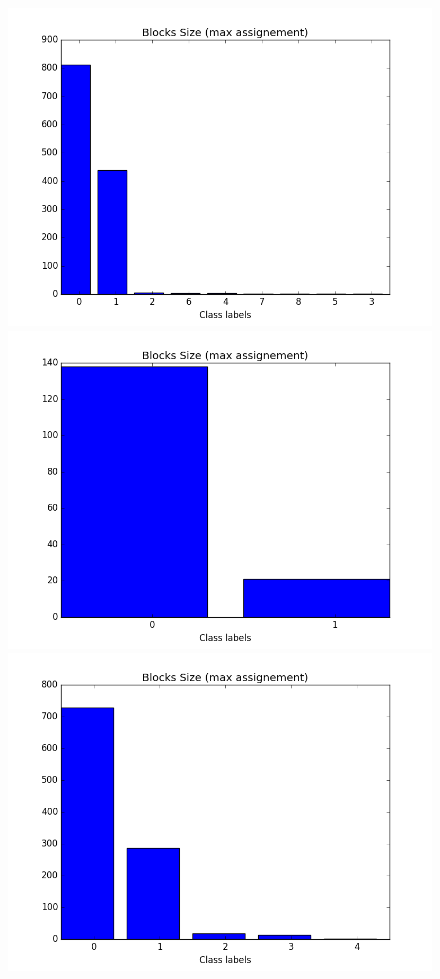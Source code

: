 \documentclass[a4paper, 12pt]{article}
\begin{document}
\begin{figure}[ht]
	\endminipage
		\vspace{-0.28cm}
	\includegraphics[scale=0.27]{img/ilfm/1/figure_5}
	\endminipage
	\includegraphics[scale=0.27]{img/ilfm/2/figure_5} 
	\endminipage
	\includegraphics[scale=0.27]{img/ilfm/3/figure_5}

\end{figure}
\end{document}
